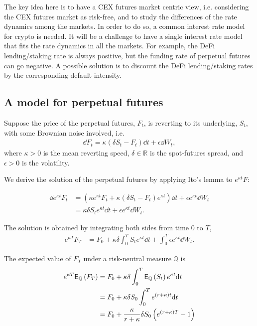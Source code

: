 \documentclass[square]{article} %
\theoremstyle{plain}
\theoremstyle{definition} %
\begin{document}
The key idea here is to have a CEX futures market centric view, i.e. considering the CEX futures market as risk-free,
 and to study the differences of the rate dynamics among the markets. 
 In order to do so, a common interest rate model for crypto is needed. 
 It will be a challenge to have a single interest rate model that fits the rate dynamics in all the markets.
 For example, the DeFi lending/staking rate is always positive, but the funding rate of perpetual futures can go negative.  
 A possible solution is to discount the DeFi lending/staking rates by the corresponding default intensity.

\subsection{A model for perpetual futures}
Suppose the price of the perpetual futures, $F_t$, is reverting to its underlying, $S_t$, with some Brownian noise involved, i.e.
\begin{align*}
\dd F_t = \kappa \left(\delta S_t - F_t \right)\dd t + \epsilon \dd W_t,
\end{align*}
where $\kappa>0$ is the mean reverting speed, $\delta \in \mathbb{R}$ is the spot-futures spread, and $\epsilon>0$ is the volatility.

We derive the solution of the perpetual futures by applying Ito's lemma to $e^{\kappa t}F$:

\begin{align*}
\dd e^{\kappa t} F_t &= \left(\kappa e^{\kappa t}F_t+ \kappa \left(\delta S_t - F_t\right)e^{\kappa t}\right)\dd t + \epsilon e^{\kappa t}\dd W_t\\
                      &= \kappa \delta S_t e^{\kappa t}\dd t + \epsilon e^{\kappa t}\dd W_t.
\end{align*}

The solution is obtained by integrating both sides from time $0$ to $T$,
\begin{align*}
  e^{\kappa T} F_T &= F_0 +  \kappa \delta \int_0^T S_t e^{\kappa t}\dd t + \int_0^T \epsilon e^{\kappa t}\dd W_t.
  \end{align*}

The expected value of $F_T$ under a risk-neutral measure $\mathbb{Q}$ is
\begin{align*}
  e^{\kappa T} \mathbb{\sf E}_\mathbb{Q} \left(F_T\right) &= F_0 +  \kappa \delta \int_0^T \mathbb{\sf E}_\mathbb{Q}\left(S_t\right) e^{\kappa t}{\rm d} t\\
                                                          &= F_0 +  \kappa \delta S_0 \int_0^T  e^{(r+\kappa) t}{\rm d} t\\
                                                          &= F_0 +  \frac{\kappa}{r+\kappa} \delta S_0 \left(e^{(r+\kappa) T} - 1\right)\\
\end{align*}
\end{document}
